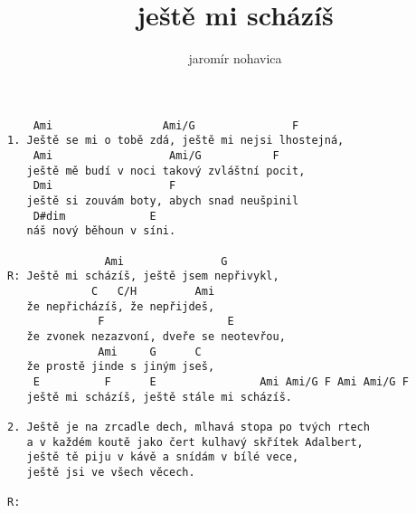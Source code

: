 \author{jaromír nohavica}
\title{ještě mi scházíš}
\maketitle
\begin{verbatim}
    Ami                 Ami/G               F
1. Ještě se mi o tobě zdá, ještě mi nejsi lhostejná,
    Ami                  Ami/G           F
   ještě mě budí v noci takový zvláštní pocit,
    Dmi                  F
   ještě si zouvám boty, abych snad neušpinil
    D#dim             E
   náš nový běhoun v síni.

               Ami               G
R: Ještě mi scházíš, ještě jsem nepřivykl,
             C   C/H         Ami
   že nepřicházíš, že nepřijdeš,
              F                   E
   že zvonek nezazvoní, dveře se neotevřou,
              Ami     G      C
   že prostě jinde s jiným jseš,
    E          F      E                Ami Ami/G F Ami Ami/G F
   ještě mi scházíš, ještě stále mi scházíš.

2. Ještě je na zrcadle dech, mlhavá stopa po tvých rtech
   a v každém koutě jako čert kulhavý skřítek Adalbert,
   ještě tě piju v kávě a snídám v bílé vece,
   ještě jsi ve všech věcech.

R:
\end{verbatim}